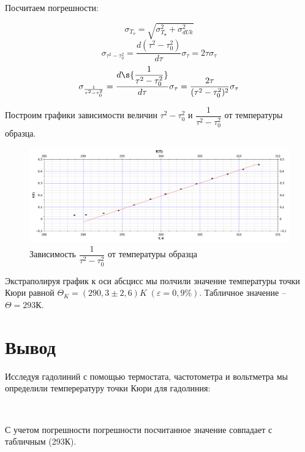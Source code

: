 \documentclass[12pt,a4paper]{article}
\begin{document}
Посчитаем погрешности: 

$$
\sigma_{T_o} = \sqrt{\sigma_{T_в}^2 + \sigma_{dUk}^2}
$$
\begin{equation}\label{}
\sigma_{\tau^2 - \tau_0^2} = \dfrac{d(\tau^2 - \tau_0^2)}{d\tau}\sigma_\tau = 2\tau\sigma_\tau
\end{equation}
\begin{equation}\label{}
\sigma_{\frac{1}{\tau^2 - \tau_0^2}} = \dfrac{d\s{\dfrac{1}{\tau^2 - \tau_0^2}}}{d\tau}\sigma_\tau = \dfrac{2\tau}{{(\tau^2 - \tau_0^2)^2}}\sigma_\tau
\end{equation}

Построим графики зависимости величин $ \tau^2 - \tau_0^2 $ и $ \dfrac{1}{\tau^2 - \tau_0^2} $ от температуры образца.
\par

\vspace{1mm}
\begin{figure}[h!]
	\includegraphics[scale=0.37]{Graph3.pdf}
	\caption{Зависимость $ \dfrac{1}{ \tau^2 - \tau_0^2} $ от температуры образца}
\end{figure}


Экстраполируя график к оси абсцисс мы полчили значение температуры точки Кюри равной $\Theta_K = (290,3 \pm 2,6) K \; (\varepsilon = 0,9 \%)$. Табличное значение -- $ \Theta = 293 К $.


\section{Вывод}

Исследуя гадолиний с помощью термостата, частотометра и вольтметра мы определили темперературу точки Кюри для гадолиния:

\begin{center}
	{} \\
\end{center} 

С учетом погрешности погрешности посчитанное значение совпадает с табличным (293К).
\end{document}
